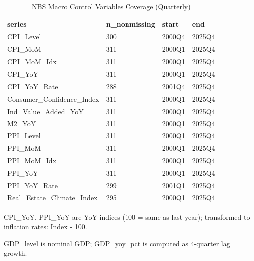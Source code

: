 \begin{table}[!htbp]
\centering
\small
\caption{NBS Macro Control Variables Coverage (Quarterly)}
\label{tab:nbs_coverage}
\begin{threeparttable}
\begin{tabular}{@{}llll@{}}
\toprule
series & n_nonmissing & start & end \\
\midrule
CPI_Level & 300 & 2000Q4 & 2025Q4 \\
CPI_MoM & 311 & 2000Q1 & 2025Q4 \\
CPI_MoM_Idx & 311 & 2000Q1 & 2025Q4 \\
CPI_YoY & 311 & 2000Q1 & 2025Q4 \\
CPI_YoY_Rate & 288 & 2001Q4 & 2025Q4 \\
Consumer_Confidence_Index & 311 & 2000Q1 & 2025Q4 \\
Ind_Value_Added_YoY & 311 & 2000Q1 & 2025Q4 \\
M2_YoY & 311 & 2000Q1 & 2025Q4 \\
PPI_Level & 311 & 2000Q1 & 2025Q4 \\
PPI_MoM & 311 & 2000Q1 & 2025Q4 \\
PPI_MoM_Idx & 311 & 2000Q1 & 2025Q4 \\
PPI_YoY & 311 & 2000Q1 & 2025Q4 \\
PPI_YoY_Rate & 299 & 2001Q1 & 2025Q4 \\
Real_Estate_Climate_Index & 295 & 2000Q1 & 2025Q4 \\
\bottomrule
\end{tabular}
\begin{tablenotes}[flushleft]
\footnotesize
\item CPI\_YoY, PPI\_YoY are YoY indices (100 = same as last year); transformed to inflation rates: Index - 100.
\item GDP\_level is nominal GDP; GDP\_yoy\_pct is computed as 4-quarter lag growth.
\end{tablenotes}
\end{threeparttable}
\end{table}
